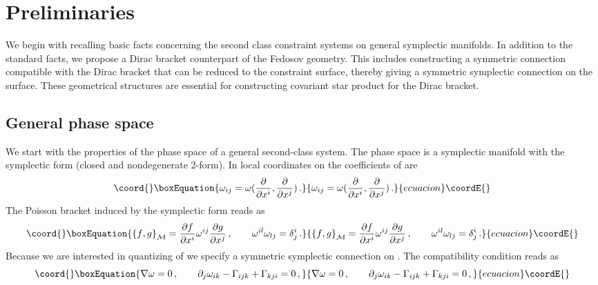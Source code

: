 \documentclass[a4paper,11pt]{amsart}
\numberwithin{thm}{section} %
\numberwithin{equation}{section} %
\numberwithin{figure}{section} %
\providecommand{\pb}[2]{\left\{{}#1{},{}#2{}\right\}}
\renewcommand{\:}{{\rm\, :\,}}
\def\d{\partial}
\providecommand{\ddl}[2]{\displaystyle\frac{{\d #1}}{\d #2}}
\def\manM{{\mathcal M}}
\begin{document}
\section{Preliminaries}\label{sec:preliminaries}
We begin with recalling basic facts concerning the second 
class constraint systems on general symplectic manifolds. 
In addition to the standard facts, we propose a Dirac bracket
counterpart of the Fedosov geometry.  This includes constructing
a symmetric connection compatible with the Dirac bracket that can be
reduced to the constraint surface, thereby giving a symmetric
symplectic connection on the surface. These geometrical structures are
essential for constructing covariant star product for the Dirac
bracket.

\subsection{General phase space}
We start with the properties of the phase space of a general
second-class system.  The phase space is a
symplectic manifold \myHighlight{$\manM$}\coordHE{} with the symplectic form \myHighlight{$\omega$}\coordHE{}
(closed and nondegenerate 2-form).  In local coordinates
\coordHE{}
on \myHighlight{$\manM$}\coordHE{} the coefficients of \myHighlight{$\omega$}\coordHE{} are
\begin{equation}\coord{}\boxEquation{
\label{aaa}
  \omega_{ij}=\omega({\frac{\d}{\d x^i},\frac{\d}{\d x^j}})\,.
}{
\omega_{ij}=\omega({\frac{\d}{\d x^i},\frac{\d}{\d x^j}})\,.
}{ecuacion}\coordE{}\end{equation}
The Poisson bracket induced by the symplectic form reads as
\begin{equation}\coord{}\boxEquation{
  \pb{f}{g}_\manM=\ddl{f}{x^i}\omega^{ij}\ddl{g}{x^j}\,, \qquad
  \omega^{il}\omega_{lj}=\delta^{i}_{j}\,.
}{
  \pb{f}{g}_\manM=\ddl{f}{x^i}\omega^{ij}\ddl{g}{x^j}\,, \qquad
  \omega^{il}\omega_{lj}=\delta^{i}_{j}\,.
}{ecuacion}\coordE{}\end{equation}
Because we are interested in quantizing of \myHighlight{$\manM$}\coordHE{} we specify a
symmetric symplectic connection \myHighlight{$\Gamma$}\coordHE{} on \myHighlight{$\manM$}\coordHE{}. The
compatibility condition reads as
\begin{equation}\coord{}\boxEquation{
  \nabla \omega =0 \,, \qquad \d_j\omega_{ik}-\Gamma_{ijk}+\Gamma_{kji}=0\,,
}{
  \nabla \omega =0 \,, \qquad \d_j\omega_{ik}-\Gamma_{ijk}+\Gamma_{kji}=0\,,
}{ecuacion}\coordE{}\end{equation}
\end{document}
